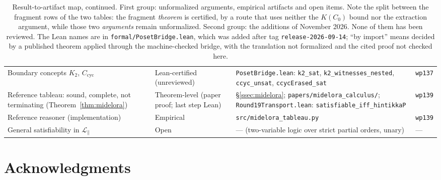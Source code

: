 \documentclass[11pt]{article}
\newcommand{\code}[1]{\texttt{#1}}
\theoremstyle{plain}
\theoremstyle{definition}
\begin{document}
\begin{table}[!htbp]
\begin{tabular}{@{}L{0.235\textwidth}L{0.115\textwidth}L{0.40\textwidth}L{0.11\textwidth}@{}}
Boundary concepts $K_2$, $C_{\mathrm{cyc}}$ & Lean-certified (unreviewed) & \texttt{PosetBridge.lean}: \code{k2\_sat}, \code{k2\_witnesses\_nested}, \code{ccyc\_unsat}, \code{ccycErased\_sat} & \texttt{wp137}\\
Reference tableau: sound, complete, not terminating (Theorem~\ref{thm:midelora}) & Theorem-level (paper proof; last step Lean) & \S\ref{ssec:midelora}; \texttt{papers/midelora\_calculus/}; \texttt{Round19Transport.lean}: \code{satisfiable\_iff\_hintikkaP} & \texttt{wp139}\\
Reference reasoner (implementation) & Empirical & \texttt{src/midelora\_tableau.py} & \texttt{wp139}\\
General satisfiability in $\mathcal L_{\parallel}$ & Open & --- (two-variable logic over strict partial orders, unary) & ---\\
\bottomrule
\end{tabular}
\caption{Result-to-artifact map, continued. First group: unformalized
arguments, empirical artifacts and open items. Note the split between the
fragment rows of the two tables: the fragment \emph{theorem} is certified, by
a route that uses neither the $K(C_0)$ bound nor the extraction argument,
while those two \emph{arguments} remain unformalized. Second group: the
additions of November 2026. None of them has been reviewed. The Lean names are in
\texttt{formal/PosetBridge.lean}, which was added after tag
\texttt{release-2026-09-14}; ``by import'' means decided by a published
theorem applied through the machine-checked bridge, with the translation not
formalized and the cited proof not checked here.}
\label{tab:artifacts-nov}
\end{table}

\clearpage
\section*{Acknowledgments}
\end{document}
